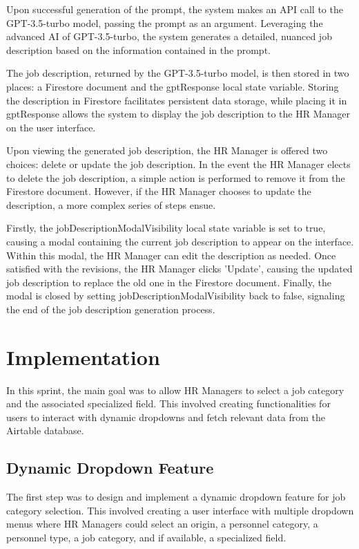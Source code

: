 Upon successful generation of the prompt, the system makes an API call to the GPT-3.5-turbo model, passing the prompt as an argument. Leveraging the advanced AI of GPT-3.5-turbo, the system generates a detailed, nuanced job description based on the information contained in the prompt.

The job description, returned by the GPT-3.5-turbo model, is then stored in two places: a Firestore document and the gptResponse local state variable. Storing the description in Firestore facilitates persistent data storage, while placing it in gptResponse allows the system to display the job description to the HR Manager on the user interface.

Upon viewing the generated job description, the HR Manager is offered two choices: delete or update the job description. In the event the HR Manager elects to delete the job description, a simple action is performed to remove it from the Firestore document. However, if the HR Manager chooses to update the description, a more complex series of steps ensue.

Firstly, the jobDescriptionModalVisibility local state variable is set to true, causing a modal containing the current job description to appear on the interface. Within this modal, the HR Manager can edit the description as needed. Once satisfied with the revisions, the HR Manager clicks 'Update', causing the updated job description to replace the old one in the Firestore document. Finally, the modal is closed by setting jobDescriptionModalVisibility back to false, signaling the end of the job description generation process.


\section{Implementation}
In this sprint, the main goal was to allow HR Managers to select a job category and the associated specialized field. This involved creating functionalities for users to interact with dynamic dropdowns and fetch relevant data from the Airtable database.

\subsection{Dynamic Dropdown Feature} 
The first step was to design and implement a dynamic dropdown feature for job category selection. This involved creating a user interface with multiple dropdown menus where HR Managers could select an origin, a personnel category, a personnel type, a job category, and if available, a specialized field.

